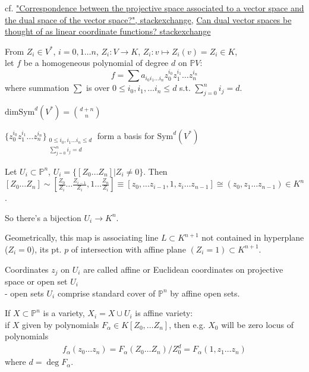 cf. \href{https://math.stackexchange.com/questions/62588/correspondence-between-the-projective-space-associated-to-a-vector-space-and-the}{"Correspondence between the projective space associated to a vector space and the dual space of the vector space?", stackexchange}, \href{https://math.stackexchange.com/questions/2093271/can-dual-vector-spaces-be-thought-of-as-linear-coordinate-functions}{Can dual vector spaces be thought of as linear coordinate functions? stackexchange}

From $Z_i \in V^*$, $i = 0, 1 \dots n$, $Z_i : V \to K$, $Z_i : v \mapsto Z_i(v) = Z_i \in K$, \\
let $f$ be a homogeneous polynomial of degree $d$ on $\mathbb{P}V$:
\[
f = \sum a_{i_0 i_1 \dots i_n} z_0^{i_0} z_1^{i_1} \dots z_n^{i_n} 
\]
where summation $\sum$ is over $0 \leq i_0, i_1, \dots i_n \leq d$ s.t. $\sum_{j=0}^n i_j = d$.

$\text{dim}{\text{Sym}^d(V^*)} = \binom{d+n}{n}$

$\lbrace z_0^{i_0} z_1^{i_1} \dots z_n^{i_n} \rbrace_{ \substack{ 0 \leq i_0 , i_1 \dots i_n \leq d \\ \sum_{j=0}^n i_j = d } }$ form a basis for $\text{Sym}^d(V^*)$
 
Let $U_i \subset \mathbb{P}^n$, $U_i = \lbrace [Z_0 \dots Z_n ] | Z_i \neq 0 \rbrace$. Then $[Z_0 \dots Z_n ] \sim \left[ \frac{Z_0}{Z_i} \dots \frac{Z_{i-1}}{ Z_i }, 1 \dots \frac{Z_n}{Z_i} \right] \equiv [ z_0, \dots z_{i-1} , 1 , z_i \dots z_{n-1} ] \cong (z_0 , z_1 \dots z_{n-1}) \in K^n$. 

So there's a bijection $U_i \to K^n$.

Geometrically, this map is associating line $L \subset K^{n+1}$ not contained in hyperplane ($Z_i = 0$), its pt. $p$ of intersection with affine plane $(Z_i = 1) \subset K^{n+1}$.  

Coordinates $z_j$ on $U_i$ are called affine or Euclidean coordinates on projective space or open set $U_i$ \\
- open sets $U_i$ comprise standard cover of $\mathbb{P}^n$ by affine open sets.

If $X \subset \mathbb{P}^n$ is a variety, $X_i = X \cup U_i$ is affine variety: \\
if $X$ given by polynomials $F_{\alpha} \in K[Z_0 , \dots Z_n]$, then e.g. $X_0$ will be zero locus of polynomials
\[
\begin{gathered}
f_{\alpha}(z_0 \dots z_n) = F_{\alpha}(Z_0 \dots Z_n) / Z_0^d = F_{\alpha}(1, z_1 \dots z_n)
\end{gathered}
\]
where $d = \deg{F_{\alpha}}$. 

